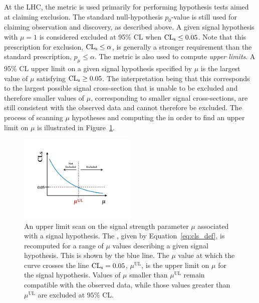 At the LHC, the \cls metric is used primarily for performing hypothesis tests aimed at claiming exclusion.
The standard null-hypothesis $p_0$-value is still used for claiming observation and discovery, as described above.
A given signal hypothesis with $\mu = 1$ is considered excluded at 95\% CL when $\text{CL}_{\text{s}} \le 0.05$.
Note that this prescription for exclusion, $\text{CL}_{\text{s}} \le \alpha$, is generally a stronger requirement than the
standard prescription, $p_{\mu} \le \alpha$.
The \cls metric is also used to compute \textit{upper limits}.
A 95\% CL upper limit on a given signal hypothesis specified by $\mu$
is the largest value of $\mu$ satisfying $\text{CL}_{\text{s}} \ge 0.05$.
The interpretation being that this corresponds to the largest possible signal cross-section
that is unable to be excluded and therefore smaller values of $\mu$, corresponding
to smaller signal cross-sections, are still consistent with the observed data and cannot therefore
be excluded.
The process of scanning $\mu$ hypotheses and computing the \cls in order to find
an upper limit on $\mu$ is illustrated in Figure~\ref{fig:upper_limit_scan_cartoon}.

\begin{figure}[!htb]
    \begin{center}
        \includegraphics[width=0.5\textwidth]{figures/common_ana/stat_hypo/upper_limit_scan_examplePDF}
        \caption{
            An upper limit scan on the signal strength parameter $\mu$ associated with a signal hypothesis.
            The \cls, given by Equation~\ref{eq:cls_def}, is recomputed for a range of $\mu$ values
            describing a given signal hypothesis.
            This is shown by the blue line.
            The $\mu$ value at which the \cls curve crosses the line $\text{CL}_{\text{s}} = 0.05$, $\mu^{\text{UL}}$, is the
            upper limit on $\mu$ for the signal hypothesis.
            Values of $\mu$ smaller than $\mu^{\text{UL}}$ remain compatible with the observed data,
            while those values greater than $\mu^{\text{UL}}$ are excluded at $95\%$ CL.
        }
        \label{fig:upper_limit_scan_cartoon}
    \end{center}
\end{figure}

